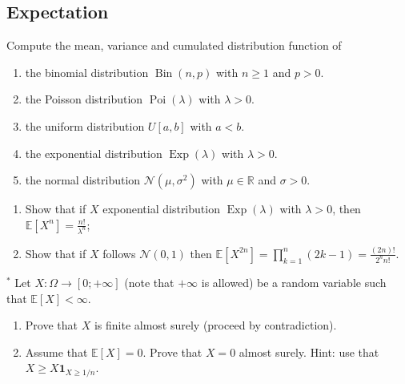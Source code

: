\begin{center}
    \section*{Expectation}
\end{center}

\begin{Exercise}
    Compute the mean, variance and cumulated distribution function of 
\vspace*{0.2cm}

\begin{enumerate}
  \item the binomial distribution $\operatorname{Bin}(n, p)$ with $n \geq 1$ and $p>0$.

  \item the Poisson distribution $\operatorname{Poi}(\lambda)$ with $\lambda>0$.

  \item the uniform distribution $U[a, b]$ with $a<b$.

  \item the exponential distribution $\operatorname{Exp}(\lambda)$ with $\lambda>0$.

  \item the normal distribution $\mathcal{N}\left(\mu, \sigma^{2}\right)$ with $\mu \in \mathbb{R}$ and $\sigma>0$.

\end{enumerate}
\end{Exercise}

\begin{Exercise}
    \begin{enumerate}
  \item Show that if $X$ exponential distribution $\operatorname{Exp}(\lambda)$ with $\lambda>0$, then $\mathbb{E}\left[X^{n}\right]=\frac{n !}{\lambda^{n}}$;

  \item Show that if $X$ follows $\mathcal{N}(0,1)$ then $\mathbb{E}\left[X^{2 n}\right]=\prod_{k=1}^{n}(2 k-1)=\frac{(2 n) !}{2^{n} n !}$.

\end{enumerate}
\end{Exercise}

\begin{Exercise}
    ${ }^{*}$ Let $X: \Omega \rightarrow[0 ;+\infty]$ (note that $+\infty$ is allowed) be a random variable such that $\mathbb{E}[X]<\infty$.

\begin{enumerate}
  \item Prove that $X$ is finite almost surely (proceed by contradiction).

  \item Assume that $\mathbb{E}[X]=0$. Prove that $X=0$ almost surely. Hint: use that $X \geq X \mathbf{1}_{X \geq 1 / n}$.

\end{enumerate}
\end{Exercise}
